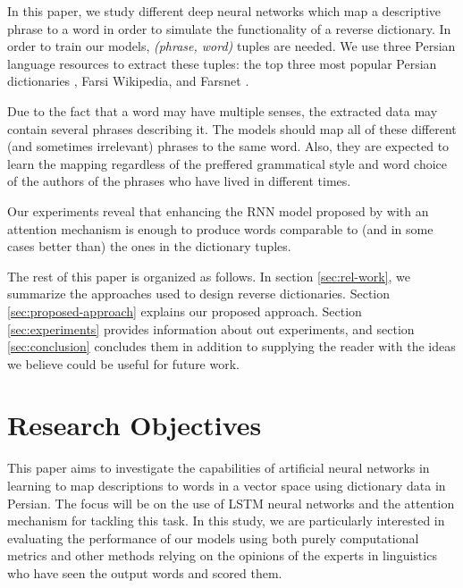 \documentclass{article}
\begin{document}
In this paper, we study different deep neural networks which map a descriptive phrase to a word in order to simulate the functionality of a reverse dictionary. In order to train our models, \textit{(phrase, word)} tuples are needed. We use three Persian language resources to extract these tuples: the top three most popular Persian dictionaries \citep{amid,dehkhoda,moin}, Farsi Wikipedia, and Farsnet \citep{shamsfard2010semi}.

Due to the fact that a word may have multiple senses, the extracted data may contain several phrases describing it. The models should map all of these different (and sometimes irrelevant) phrases to the same word. Also, they are expected to learn the mapping regardless of the preffered grammatical style and word choice of the authors of the phrases who have lived in different times.


Our experiments reveal that enhancing the RNN model proposed by \citet{hill2016learning} with an attention mechanism \citep{bahdanau2014neural} is enough to produce words comparable to (and in some cases better than) the ones in the dictionary tuples.

The rest of this paper is organized as follows. In section \ref{sec:rel-work}, we summarize the approaches used to design reverse dictionaries. Section \ref{sec:proposed-approach} explains our proposed approach. Section \ref{sec:experiments} provides information about out experiments, and section \ref{sec:conclusion} concludes them in addition to supplying the reader with the ideas we believe could be useful for future work.


\section{Research Objectives \label{sec:research-objectives}}
This paper aims to investigate the capabilities of artificial neural networks in learning to map descriptions to words in a vector space using dictionary data in Persian. The focus will be on the use of LSTM \cite{hochreiter1997long} neural networks and the attention mechanism \cite{bahdanau2014neural} for tackling this task. In this study, we are particularly interested in evaluating the performance of our models using both purely computational metrics and other methods relying on the opinions of the experts in linguistics who have seen the output words and scored them. 
\end{document}
